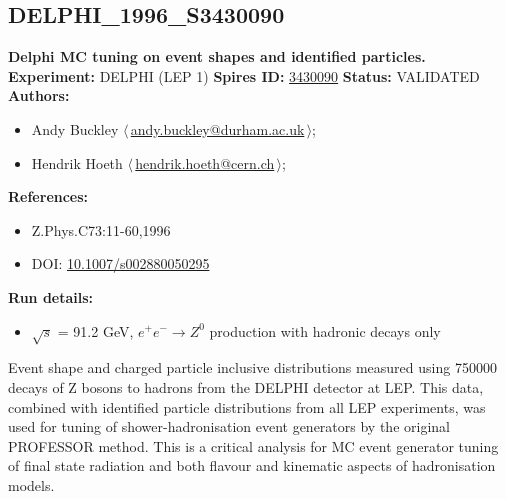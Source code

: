 \subsection[DELPHI\_1996\_S3430090]{DELPHI\_1996\_S3430090\,\cite{Abreu:1996na}}
\textbf{Delphi MC tuning on event shapes and identified particles.}\newline
\textbf{Experiment:} DELPHI (LEP 1) \newline
\textbf{Spires ID:} \href{http://www.slac.stanford.edu/spires/find/hep/www?rawcmd=key+3430090}{3430090}\newline
\textbf{Status:} VALIDATED\newline
\textbf{Authors:}
\begin{itemize}
  \item Andy Buckley $\langle\,$\href{mailto:andy.buckley@durham.ac.uk}{andy.buckley@durham.ac.uk}$\,\rangle$;
  \item Hendrik Hoeth $\langle\,$\href{mailto:hendrik.hoeth@cern.ch}{hendrik.hoeth@cern.ch}$\,\rangle$;
\end{itemize}
\textbf{References:}
\begin{itemize}
  \item Z.Phys.C73:11-60,1996
  \item DOI: \href{http://dx.doi.org/10.1007/s002880050295}{10.1007/s002880050295}
\end{itemize}
\textbf{Run details:}
\begin{itemize}

  \item \ensuremath{\sqrt{s}} = 91.2 GeV, $e^+ e^- \ensuremath{\to} Z^0$ production with hadronic decays only\end{itemize}

\noindent Event shape and charged particle inclusive distributions measured using 750000 decays of Z bosons to hadrons from the DELPHI detector at LEP. This data, combined with identified particle distributions from all LEP experiments, was used for tuning of shower-hadronisation event generators by the original PROFESSOR method.  This is a critical analysis for MC event generator tuning of final state radiation and both flavour and kinematic aspects of hadronisation models.

\clearpage


\clearpage

